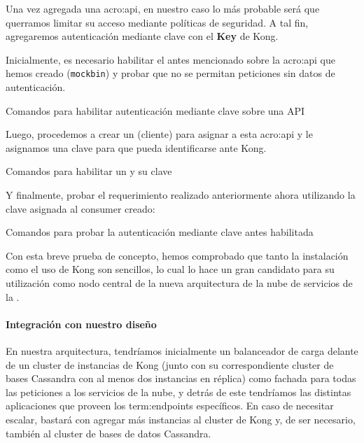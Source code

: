 Una vez agregada una \gls{acro:api}, en nuestro caso lo más probable será que querramos limitar su acceso mediante políticas de seguridad. A tal fin, agregaremos autenticación mediante clave con el  \textbf{Key} de Kong.

Inicialmente, es necesario habilitar el  antes mencionado sobre la \gls{acro:api} que hemos creado (\texttt{mockbin}) y probar que no se permitan peticiones sin datos de autenticación.

\begin{listing}[H]
  \caption{Comandos para habilitar autenticación mediante clave sobre una API}
  \label{soa:tecnologias:kong:bash-probar-sin-auth}
\end{listing}

Luego, procedemos a crear un  (cliente) para asignar a esta \gls{acro:api} y le asignamos una clave para que pueda identificarse ante Kong.

\begin{listing}[H]
  \caption{Comandos para habilitar un  y su clave}
  \label{soa:tecnologias:kong:bash-habilitar-key-auth}
\end{listing}

Y finalmente, probar el requerimiento realizado anteriormente ahora utilizando la clave asignada al consumer creado:

\begin{listing}[H]
  \caption{Comandos para probar la autenticación mediante clave antes habilitada}
  \label{soa:tecnologias:kong:bash-probar-key-auth}
\end{listing}


Con esta breve prueba de concepto, hemos comprobado que tanto la instalación como el uso de Kong son sencillos, lo cual lo hace un gran candidato para su utilización como nodo central de la nueva arquitectura de la nube de servicios de la {\unlp}.

\paragraph{Integración con nuestro diseño}

En nuestra arquitectura, tendríamos inicialmente un balanceador de carga delante de un cluster de instancias de Kong (junto con su correspondiente cluster de bases Cassandra con al menos dos instancias en réplica) como fachada para todas las peticiones a los servicios de la nube, y detrás de este tendríamos las distintas aplicaciones que proveen los \glspl{term:endpoint} específicos. En caso de necesitar escalar, bastará con agregar más instancias al cluster de Kong y, de ser necesario, también al cluster de bases de datos Cassandra.

